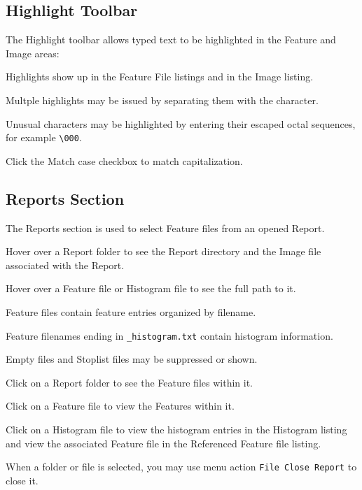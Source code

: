 \documentclass[10pt,twoside]{article}
\begin{document}
\subsection{Highlight Toolbar}
The Highlight toolbar allows typed text to be highlighted in the Feature and Image areas:
\begin{compactitem}
\item Highlights show up in the Feature File listings and in the Image listing.
\item Multple highlights may be issued by separating them with the \textbar \xspace character.
\item Unusual characters may be highlighted by entering their escaped octal sequences,
for example \texttt{\textbackslash 000}.
\item Click the Match case checkbox to match capitalization.
\end{compactitem}
\subsection{Reports Section}
The Reports section is used to select Feature files from an opened Report.
\begin{compactitem}
\item Hover over a Report folder to see the Report directory
and the Image file associated with the Report.
\item Hover over a Feature file or Histogram file to see the full path to it.
\begin{compactitem}
\item Feature files contain feature entries organized by filename.
\item Feature filenames ending in \texttt{\_histogram.txt} contain histogram information.
\item Empty files and Stoplist files may be suppressed or shown.
\end{compactitem}
\item Click on a Report folder to see the Feature files within it.
\item Click on a Feature file to view the Features within it.
\item Click on a Histogram file to view the histogram entries in the Histogram listing
and view the associated Feature file in the Referenced Feature file listing.
\item When a folder or file is selected,
you may use menu action \texttt{File \textbar \xspace Close Report} to close it.
\end{compactitem}
\end{document}
